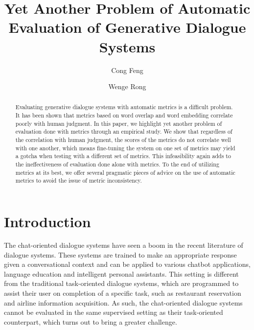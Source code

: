 \documentclass[runningheads]{llncs}
\begin{document}
    \title{Yet Another Problem of Automatic Evaluation of Generative Dialogue Systems}


    \author{Cong Feng \and Wenge Rong}



    \maketitle

    \begin{abstract}
        Evaluating generative dialogue systems with automatic metrics is a difficult problem. It has been shown that metrics based on word overlap and word embedding correlate poorly with human judgment. In this paper, we highlight yet another problem of evaluation done with metrics through an empirical study. We show that regardless of the correlation with human judgment, the scores of the metrics do not correlate well with one another, which means fine-tuning the system on one set of metrics may yield a gotcha when testing with a different set of metrics. This infeasibility again adds to the ineffectiveness of evaluation done alone with metrics. To the end of utilizing metrics at its best, we offer several pragmatic pieces of advice on the use of automatic metrics to avoid the issue of metric inconsistency.
    \end{abstract}


    \section{Introduction}
    The chat-oriented dialogue systems have seen a boom in the recent literature of dialogue systems. These systems are trained to make an appropriate response given a conversational context and can be applied to various chatbot applications, language education and intelligent personal assistants. This setting is different from the traditional task-oriented dialogue systems, which are programmed to assist their user on completion of a specific task, such as restaurant reservation and airline information acquisition. As such, the chat-oriented dialogue systems cannot be evaluated in the same supervised setting as their task-oriented counterpart, which turns out to bring a greater challenge.
\end{document}
